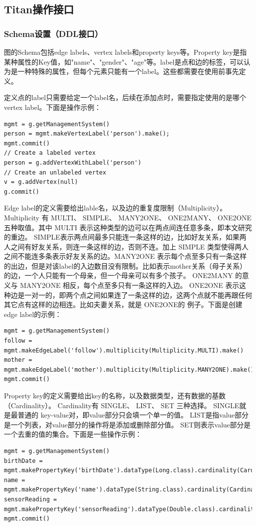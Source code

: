 \subsection{Titan操作接口}
\subsubsection{Schema设置（DDL接口）}
图的Schema包括edge labels、vertex labels和property keys等。Property key是指某种属性的Key值，如"name"、"gender"、"age"等。label是点和边的标签，可以认为是一种特殊的属性，但每个元素只能有一个label。这些都需要在使用前事先定义。

定义点的label只需要给定一个label名，后续在添加点时，需要指定使用的是哪个vertex label。下面是操作示例：
\begin{lstlisting}
mgmt = g.getManagementSystem()
person = mgmt.makeVertexLabel('person').make();
mgmt.commit()
// Create a labeled vertex
person = g.addVertexWithLabel('person')
// Create an unlabeled vertex
v = g.addVertex(null)
g.commit()
\end{lstlisting}

Edge label的定义需要给出lable名，以及边的重复度限制（Multiplicity）。
Multiplicity 有 MULTI、 SIMPLE、 MANY2ONE、 ONE2MANY、 ONE2ONE 五种取值。其中 MULTI 表示这种类型的边可以在两点间连任意多条，即本文研究的重边。 SIMPLE表示两点间最多只能连一条这样的边，比如好友关系，如果两人之间有好友关系，则连一条这样的边，否则不连。加上 SIMPLE 类型使得两人之间不能连多条表示好友关系的边。MANY2ONE 表示每个点至多只有一条这样的出边，但是对该label的入边数目没有限制。比如表示mother关系（母子关系）的边，一个人只能有一个母亲，但一个母亲可以有多个孩子。 ONE2MANY 的意义与 MANY2ONE 相反，每个点至多只有一条这样的入边。 ONE2ONE 表示这种边是一对一的，即两个点之间如果连了一条这样的边，这两个点就不能再跟任何其它点有这样的边相连。比如夫妻关系，就是 ONE2ONE的 例子。下面是创建edge label的示例：
\begin{lstlisting}
mgmt = g.getManagementSystem()
follow = mgmt.makeEdgeLabel('follow').multiplicity(Multiplicity.MULTI).make()
mother = mgmt.makeEdgeLabel('mother').multiplicity(Multiplicity.MANY2ONE).make()
mgmt.commit()
\end{lstlisting}

Property key的定义需要给出key的名称，以及数据类型，还有数据的基数（Cardinality）。 Cardinality有 SINGLE、 LIST、 SET 三种选择。 SINGLE就是最普通的 key-value对，即value部分只会填一个单一的值。 LIST是指value部分是一个列表，对value部分的操作将是添加或删除部分值。 SET则表示value部分是一个去重的值的集合。下面是一些操作示例：
\begin{lstlisting}
mgmt = g.getManagementSystem()
birthDate = mgmt.makePropertyKey('birthDate').dataType(Long.class).cardinality(Cardinality.SINGLE).make()
name = mgmt.makePropertyKey('name').dataType(String.class).cardinality(Cardinality.SET).make()
sensorReading = mgmt.makePropertyKey('sensorReading').dataType(Double.class).cardinality(Cardinality.LIST).make()
mgmt.commit()
\end{lstlisting}

